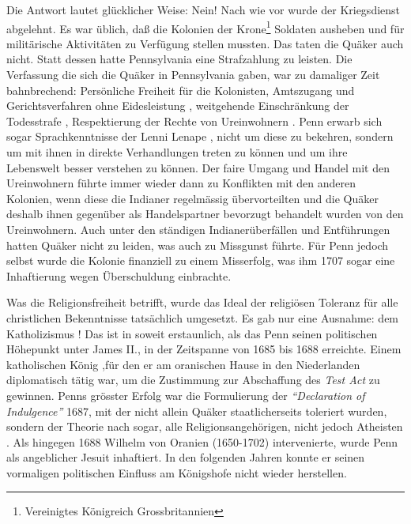 Die Antwort lautet glücklicher Weise: Nein! Nach wie vor wurde der Kriegsdienst
abgelehnt. Es war üblich, daß die Kolonien der Krone\footnote{Vereinigtes
Königreich Grossbritannien} Soldaten ausheben und für militärische
Aktivitäten zu Verfügung stellen mussten. Das taten die Quäker auch nicht. Statt
dessen hatte Pennsylvania eine Strafzahlung zu leisten. Die Verfassung die sich
die Quäker in Pennsylvania gaben, war zu damaliger Zeit bahnbrechend: Persönliche
Freiheit für die Kolonisten, Amtszugang und Gerichtsverfahren ohne
Eidesleistung , weitgehende Einschränkung der Todesstrafe
, Respektierung der Rechte von Ureinwohnern
. Penn erwarb sich sogar Sprachkenntnisse
 der Lenni Lenape , nicht
um diese zu bekehren, sondern um mit ihnen in direkte Verhandlungen treten zu
können und um ihre Lebenswelt besser verstehen zu können. Der faire Umgang und
Handel mit den Ureinwohnern führte immer wieder dann zu Konflikten mit den
anderen Kolonien, wenn diese die Indianer regelmässig übervorteilten und die Quäker
deshalb ihnen gegenüber als Handelspartner bevorzugt behandelt wurden von den
Ureinwohnern. Auch unter den ständigen Indianerüberfällen und Entführungen
hatten Quäker nicht zu leiden, was auch zu Missgunst führte. Für Penn jedoch
selbst wurde die Kolonie finanziell zu einem Misserfolg, was ihm 1707 sogar eine
Inhaftierung
 wegen Überschuldung einbrachte.


\medskip

Was die Religionsfreiheit betrifft, wurde das Ideal der religiösen Toleranz für
alle
christlichen Bekenntnisse tatsächlich umgesetzt. Es gab nur eine Ausnahme: dem
Katholizismus ! Das ist in soweit erstaunlich, als das Penn
seinen politischen Höhepunkt unter James II.,
 in der Zeitspanne von 1685 bis 1688  erreichte. Einem
katholischen König ,für den er am oranischen Hause in
den Niederlanden
 diplomatisch tätig war, um die Zustimmung zur
Abschaffung des \textit{Test Act} zu gewinnen. Penns grösster
Erfolg war die Formulierung
der \textit{"`Declaration of Indulgence"'} 1687, mit der nicht allein Quäker
staatlicherseits toleriert wurden, sondern der Theorie nach sogar, alle
Religionsangehörigen, nicht jedoch Atheisten . Als
hingegen 1688 Wilhelm von Oranien (1650-1702)  intervenierte, wurde Penn als angeblicher
Jesuit inhaftiert. In den folgenden Jahren konnte er
seinen vormaligen politischen Einfluss am Königshofe  nicht
wieder herstellen.

